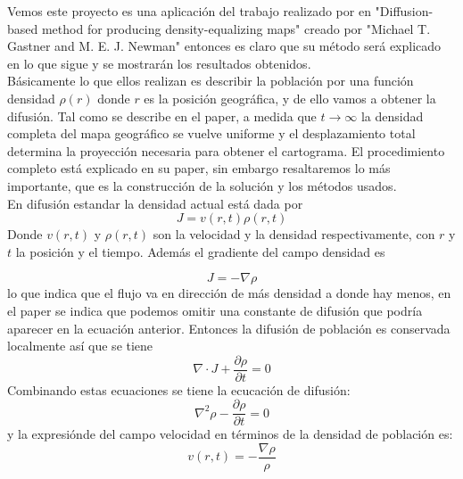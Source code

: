 \documentclass[20pt]{report}
\begin{document}
\begin{itemize}
Vemos este proyecto es una aplicaci\'on del trabajo realizado por en "Diffusion-based method for producing
density-equalizing maps" creado por   "Michael T. Gastner and M. E. J. Newman" entonces es claro que su m\'etodo ser\'a explicado en lo que sigue y se mostrar\'an los resultados obtenidos. \\
B\'asicamente lo que ellos realizan es describir la poblaci\'on  por una funci\'on densidad $\rho (r)$ donde $r$ es la posici\'on geogr\'afica, y de ello vamos a obtener la difusi\'on. Tal como se describe en el paper, a medida que $t\longrightarrow \infty$  la densidad completa del mapa geogr\'afico se vuelve  uniforme y el desplazamiento total determina la proyecci\'on necesaria para obtener el cartograma.
El procedimiento completo est\'a explicado en su paper, sin embargo resaltaremos lo m\'as importante,  que es la construcci\'on de la soluci\'on y  los m\'etodos usados.
\\
En difusi\'on estandar la densidad actual est\'a dada por
\begin{equation}
J= v(r,t)\rho (r,t)
\end{equation}
Donde $v(r,t)$ y $\rho(r,t)$ son la velocidad y la densidad respectivamente, con $r$ y $t$ la posici\'on y el tiempo. Adem\'as el gradiente del campo densidad es

\begin{equation}
J=-\nabla \rho
\end{equation}
lo que indica que el flujo  va en direcci\'on  de  m\'as densidad a donde hay menos, en el paper se indica que podemos omitir  una constante de difusi\'on  que podr\'ia aparecer en la ecuaci\'on anterior. Entonces la difusi\'on de poblaci\'on es conservada localmente  as\'i que  se tiene 
\begin{equation}
\nabla \cdot J + \dfrac{\partial \rho}{\partial t} =0
\end{equation}
Combinando estas ecuaciones se tiene la ecucaci\'on de difusi\'on:
\begin{equation}
\nabla ^2 \rho - \dfrac{\partial \rho }{\partial t}=0
\end{equation}
y la expresi\'onde del  campo velocidad en t\'erminos de la densidad de poblaci\'on es:
\begin{equation}
v(r,t)= - \dfrac{\nabla \rho}{\rho}
\end{equation}



\end{itemize}
\end{document}
